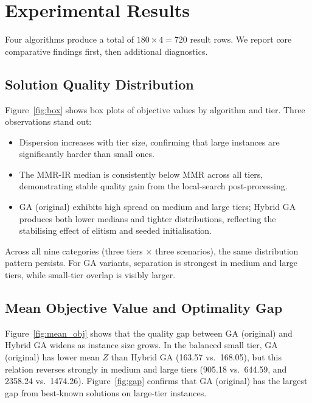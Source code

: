 \documentclass[10pt,conference]{IEEEtran}
\begin{document}
\section{Experimental Results}
\label{sec:results}

Four algorithms produce a total of $180 \times 4 = 720$ result rows.
We report core comparative findings first, then additional diagnostics.

\subsection{Solution Quality Distribution}

Figure~\ref{fig:box} shows box plots of objective values by algorithm and tier.
Three observations stand out:
\begin{itemize}
  \item Dispersion increases with tier size, confirming that large instances
        are significantly harder than small ones.
  \item The MMR-IR median is consistently below MMR across all tiers,
        demonstrating stable quality gain from the local-search post-processing.
  \item GA (original) exhibits high spread on medium and large tiers;
        Hybrid GA produces both lower medians and tighter distributions,
        reflecting the stabilising effect of elitism and seeded initialisation.
\end{itemize}
\FloatBarrier

Across all nine categories (three tiers $\times$ three scenarios), the same
distribution pattern persists.
For GA variants, separation is strongest in medium and large tiers, while
small-tier overlap is visibly larger.

\subsection{Mean Objective Value and Optimality Gap}


Figure~\ref{fig:mean_obj} shows that the quality gap between GA (original) and
Hybrid GA widens as instance size grows.  In the balanced small tier, GA
(original) has lower mean $Z$ than Hybrid GA (163.57 vs.\ 168.05), but this
relation reverses strongly in medium and large tiers (905.18 vs.\ 644.59, and
2358.24 vs.\ 1474.26).  Figure~\ref{fig:gap} confirms that GA (original) has
the largest gap from best-known solutions on large-tier instances.
\FloatBarrier
\end{document}
